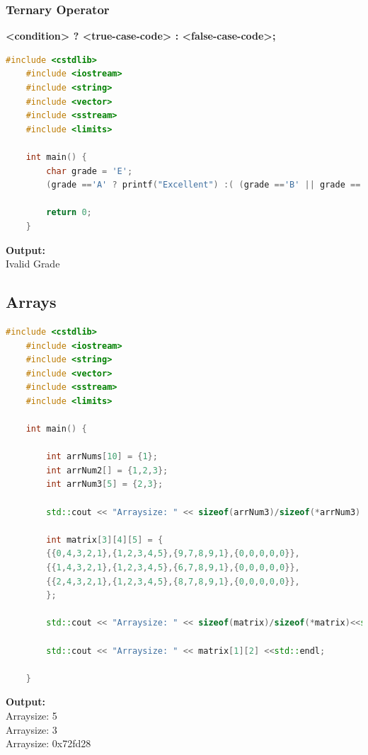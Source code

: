 \documentclass[12pt , a4paper]{article}
\newcommand{\hl}[1]{\colorbox{coolblack}{\color{cream}\textbf{#1}\color{black}}}
\begin{document}
	\subsubsection{Ternary Operator}
	\hl{<condition> ? <true-case-code> : <false-case-code>;}
	\begin{lstlisting}[language=C++]
	#include <cstdlib>
	#include <iostream>
	#include <string>
	#include <vector>
	#include <sstream>
	#include <limits>
	
	int main() {
	    char grade = 'E';
	    (grade =='A' ? printf("Excellent") :( (grade =='B' || grade =='C') ? printf("Well Done") :(grade == 'D' ? printf("You Passed") :(grade == 'F' ? printf("Better Try again") : printf("Ivalid Grade")))));
	
	    return 0;
	}
	\end{lstlisting}

	\begin{tcolorbox}
	\textbf{Output:}\\
	Ivalid Grade
	\end{tcolorbox}

	

	\subsection{Arrays}

	\begin{lstlisting}[language=C++]
	#include <cstdlib>
	#include <iostream>
	#include <string>
	#include <vector>
	#include <sstream>
	#include <limits>
	
	int main() {
	
	    int arrNums[10] = {1};
	    int arrNum2[] = {1,2,3};
	    int arrNum3[5] = {2,3};
	
	    std::cout << "Arraysize: " << sizeof(arrNum3)/sizeof(*arrNum3) <<std::endl;
	
	    int matrix[3][4][5] = {
	    {{0,4,3,2,1},{1,2,3,4,5},{9,7,8,9,1},{0,0,0,0,0}},
		{{1,4,3,2,1},{1,2,3,4,5},{6,7,8,9,1},{0,0,0,0,0}},
		{{2,4,3,2,1},{1,2,3,4,5},{8,7,8,9,1},{0,0,0,0,0}},
	    };
	
	    std::cout << "Arraysize: " << sizeof(matrix)/sizeof(*matrix)<<std::endl;
	
	    std::cout << "Arraysize: " << matrix[1][2] <<std::endl;
	
	}
	\end{lstlisting}
	\begin{tcolorbox}
	\textbf{Output:}\\
	Arraysize: 5\\
	Arraysize: 3\\
	Arraysize: 0x72fd28
	\end{tcolorbox}
\end{document}
